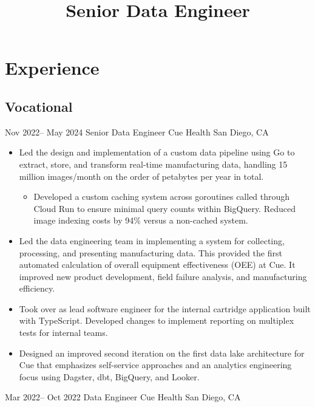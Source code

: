 \documentclass[11pt,a4paper]{moderncv}
\title{Senior Data Engineer}
\begin{document}
\maketitle

\section{Experience}
\subsection{Vocational}
\cventry
{Nov 2022-- May 2024  }
{Senior Data Engineer}
{Cue Health}
{San Diego, CA}
{}
{
    \begin{itemize}
        \item{Led the design and implementation of a custom data pipeline using Go to extract, store, and transform real-time manufacturing data, handling 15 million images/month on the order of petabytes per year in total.}
        \begin{itemize}
            \item{Developed a custom caching system across goroutines called through Cloud Run to ensure minimal query counts within BigQuery. Reduced image indexing costs by 94\% versus a non-cached system.}
        \end{itemize}
        \item{Led the data engineering team in implementing a system for collecting, processing, and presenting manufacturing data. This provided the first automated calculation of overall equipment effectiveness (OEE) at Cue. It improved new product development, field failure analysis, and manufacturing efficiency.}
        \item{Took over as lead software engineer for the internal cartridge application built with TypeScript. Developed changes to implement reporting on multiplex tests for internal teams.}
        \item{Designed an improved second iteration on the first data lake architecture for Cue that emphasizes self-service approaches and an analytics engineering focus using Dagster, dbt, BigQuery, and Looker.}
    \end{itemize}
}
\cventry
{Mar 2022-- Oct 2022  }
{Data Engineer}
{Cue Health}
{San Diego, CA}
{}
\end{document}
